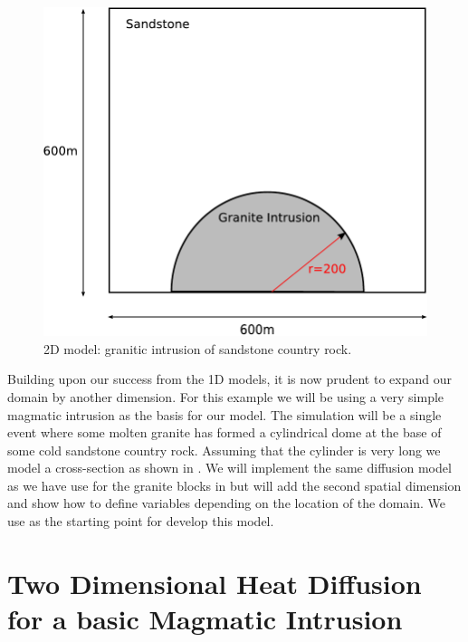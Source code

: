 
%
%
%

\begin{figure}[t]
\centerline{\includegraphics[width=4.in]{figures/twodheatdiff}}
\caption{2D model: granitic intrusion of sandstone country rock.}
\label{fig:twodhdmodel}
\end{figure}


Building upon our success from the 1D models, it is now prudent to expand our domain by another dimension. 
For this example we will be using a very simple magmatic intrusion as the basis for our model. The simulation will be a single event where some molten granite has formed a cylindrical dome at the base of some cold sandstone country rock. Assuming that the cylinder is very long 
we model a cross-section as shown in . We will implement the same 
diffusion model as we have use for the granite blocks in 
but will add the second spatial dimension and show how to define 
variables depending on the location of the domain. 
We use  as the starting point for develop this model. 

\section{Two Dimensional Heat Diffusion for a basic Magmatic Intrusion}
\label{Sec:2DHD}

